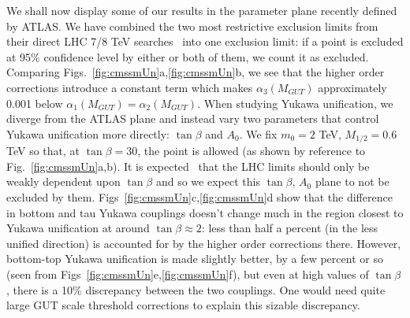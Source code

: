 \documentclass[final,3p,times,pdflatex]{elsarticle}
\begin{document}
We shall now display some of our results in the parameter plane recently
defined by ATLAS.  
We have combined the two most restrictive exclusion limits from their direct
LHC 7/8 
TeV searches~\cite{Aad:2014wea} into one exclusion limit: if a
point is excluded at 95$\%$ confidence level by either or both of them, we
count it as excluded.  Comparing Figs.~\ref{fig:cmssmUn}a,\ref{fig:cmssmUn}b,
we see that the higher order corrections introduce a constant term which 
makes $\alpha_3(M_{GUT})$ approximately 0.001 below
$\alpha_1(M_{GUT})=\alpha_2(M_{GUT})$. 
When studying Yukawa unification, we diverge from the ATLAS plane and instead
vary two parameters that control Yukawa unification more directly: $\tan
\beta$ and $A_0$. We fix $m_0=2$ TeV, $M_{1/2}=0.6$ TeV so that, at $\tan
\beta=30$, the point is allowed (as shown by reference to
Fig.~\ref{fig:cmssmUn}a,b). It is expected~\cite{Allanach:2011ut} that the LHC
limits should 
only be weakly 
dependent upon $\tan \beta$ and so we expect this $\tan \beta$, $A_0$
plane to not be excluded by
them. 
Figs~\ref{fig:cmssmUn}c,\ref{fig:cmssmUn}d show that
the difference in bottom and tau Yukawa couplings doesn't change much
in the region closest to Yukawa unification at around $\tan \beta \approx 2$:
less than half a percent (in the less unified direction) is accounted for by
the higher order corrections there.
However, bottom-top Yukawa unification is made slightly better, by a few 
percent or so (seen from Figs~\ref{fig:cmssmUn}e,\ref{fig:cmssmUn}f), but 
even at high values of 
$\tan \beta$, there is a 10$\%$ discrepancy between the two couplings. One
would need quite large GUT scale threshold corrections to explain this
sizable discrepancy.
\end{document}
